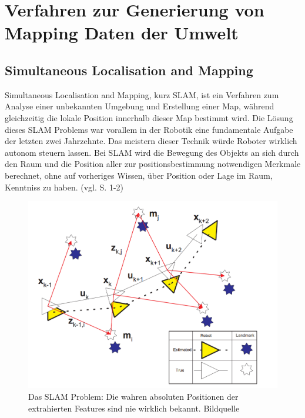 \chapter{Verfahren zur Generierung von Mapping Daten der Umwelt}

\section{Simultaneous Localisation and Mapping}

Simultaneous Localisation and Mapping, kurz SLAM, ist ein Verfahren zum Analyse einer unbekannten Umgebung und Erstellung einer Map, während gleichzeitig die lokale Position innerhalb dieser Map bestimmt wird. Die Lösung dieses SLAM Problems war vorallem in der Robotik eine fundamentale Aufgabe der letzten zwei Jahrzehnte. Das meistern dieser Technik würde Roboter wirklich autonom steuern lassen. Bei SLAM wird die Bewegung des Objekts an sich durch den Raum und die Position aller zur positionsbestimmung notwendigen Merkmale berechnet, ohne auf vorheriges Wissen, über Position oder Lage im Raum, Kenntniss zu haben. (vgl. \cite{slam} S. 1-2)

\begin{figure}[H]
	\centering
	\includegraphics[scale=0.35]{slam_problem.png}
	\caption{Das SLAM Problem: Die wahren absoluten Positionen der extrahierten Features sind nie wirklich bekannt. Bildquelle \cite{slam}}
\end{figure} 

